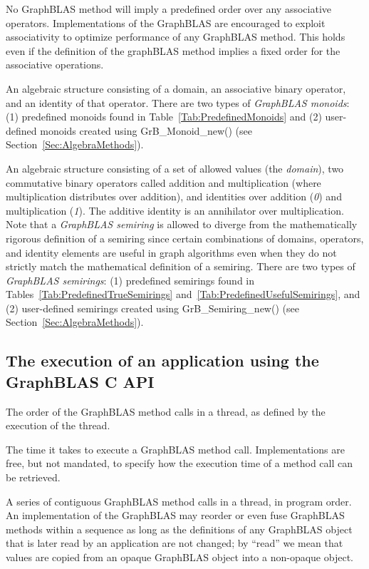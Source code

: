 No GraphBLAS method will imply a predefined order over any associative operators. Implementations of the GraphBLAS are encouraged to exploit associativity to optimize performance of any GraphBLAS method. This holds even if the definition of the graphBLAS method implies a fixed order for the associative operations.

 An algebraic structure consisting of a domain, an associative 
binary operator, and an identity of that operator.  There are two types 
of \emph{GraphBLAS monoids}: (1) predefined monoids found in 
Table~\ref{Tab:PredefinedMonoids} and (2) user-defined monoids created using 
{\sf GrB\_Monoid\_new()} (see Section~\ref{Sec:AlgebraMethods}). 

 An algebraic structure consisting of a set of allowed values
(the \emph{domain}), two commutative binary operators called addition 
and multiplication (where multiplication distributes over addition),
and identities over addition (\emph{0}) and multiplication (\emph{1}).  The additive
identity is an annihilator over multiplication.   
Note that a \emph{GraphBLAS semiring} is allowed to diverge from the mathematically 
rigorous definition of a semiring since certain combinations of domains, operators, and identity 
elements are useful in graph algorithms even when they do not strictly match the mathematical
definition of a semiring.
There are two types 
of \emph{GraphBLAS semirings}: (1) predefined semirings found in 
Tables~\ref{Tab:PredefinedTrueSemirings} and~\ref{Tab:PredefinedUsefulSemirings}, and (2) user-defined semirings created using 
{\sf GrB\_Semiring\_new()} (see Section~\ref{Sec:AlgebraMethods}). 
\glossEnd

\subsection{The execution of an application using the GraphBLAS C API}

\glossBegin
{} The order of the GraphBLAS method calls in a
thread, as defined by the execution of the thread.

 The time it takes to execute a GraphBLAS
method call. Implementations are free, but not mandated, to specify how
the execution time of a method call can be retrieved.

 A series of contiguous GraphBLAS method calls in
a thread, in program order.  An implementation of the GraphBLAS may
reorder or even fuse GraphBLAS methods within a sequence as long as the
definitions of any GraphBLAS object that is later read by an application
are not changed; by ``read'' we mean that values are copied from an
opaque GraphBLAS object into a non-opaque object.

